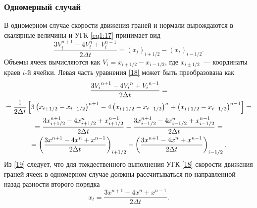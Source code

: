 \subsubsection{Одномерный случай}
\label{s:1231}
В одномерном случае скорости движения граней и нормали вырождаются в скалярные величины и УГК \eqref{eq1:17} 
принимает вид
\begin{equation}
  \label{18} 
  \frac{{3V_i^{n + 1}  - 4V_i^n + V_i^{n - 1} }}{{2\Delta t}} = \left( {x_t } \right)_{i + 1/2} - 
  \left( {x_t } \right)_{i - 1/2}.
\end{equation}
Объемы ячеек вычисляются как $V_i = x_{i + 1/2} - x_{i - 1/2}$, где $x_{i \pm 1/2}$~--- координаты 
краев $i$-й ячейки. Левая часть уравнения \eqref{18} может быть преобразована как
\begin{gather}
  \frac{{3 {V_i}^{n + 1}  - 4{V_i}^n  + {V_i}^{n - 1} }}{{2\Delta t}} =\notag  \\ = 
  \frac{1}{{2\Delta t}}\left[ {3\left( {x_{i + 1/2}  - x_{i - 1/2} } \right)^{n + 1}  - 4
  \left( {x_{i + 1/2}  - x_{i - 1/2} } \right)^n  + \left( {x_{i + 1/2}  - x_{i - 1/2} } 
  \right)^{n - 1} } \right] = \notag  \\ = 
  \frac{{3x_{i + 1/2}^{n + 1}  - 4x_{i + 1/2}^n  + x_{i + 1/2}^{n - 1} }}{{2\Delta t}} - 
  \frac{{3x_{i - 1/2}^{n + 1}  - 4x_{i - 1/2}^n  + x_{i - 1/2}^{n - 1} }}{{2\Delta t}} = \notag \\ =
  \left( {\frac{{3x_{}^{n + 1}  - 4x_{}^n  + x_{}^{n - 1} }}{{2\Delta t}}} \right)_{i + 1/2}  - 
  \left( {\frac{{3x_{}^{n + 1}  - 4x_{}^n  + x_{}^{n - 1} }}{{2\Delta t}}} \right)_{i - 1/2}.
  \label{19}
\end{gather}
Из \eqref{19} следует, что для тождественного выполнения УГК \eqref{18} скорости движения граней ячеек в 
одномерном случае должны рассчитываться по направленной назад разности второго порядка
\begin{equation}
  \label{20} 
  x_t  = \frac{{3x^{n + 1}  - 4x^n  + x^{n - 1} }}{{2\Delta t}}.
\end{equation}

